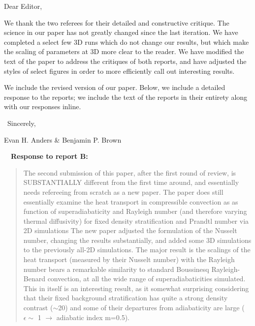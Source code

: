\documentclass[aps, 11pt, singlecolumn]{revtex4-1} %
\begin{document}
\noindent
Dear Editor,
$\,$\newline

\newenvironment{myquotation}{
\begin{quotation}
\itshape
}{ 
\end{quotation}
}

\begin{singlespace}
We thank the two referees for their detailed and constructive critique.
The science in our paper has not greatly changed since the last iteration.
We have completed a select few 3D runs which do not change our results,
but which make the scaling of parameters at 3D more clear to the reader.
We have modified the text of the paper to address the critiques of
both reports, and have adjusted the styles of select figures in order to
more efficiently call out interesting results.

We include the revised version of our paper.  Below, we include a
detailed response to the reports; we include the text of the reports
in their entirety along with our responses inline.

$\,$\newline
\noindent
Sincerely,

Evan H. Anders \& Benjamin P. Brown




$\,$
\newline
$\,$
\newline
\noindent
\Large{\textbf{Response to report B:}}\newline$\,$\newline\indent

\begin{myquotation}

The second submission of this paper, after the first round of review,
is SUBSTANTIALLY different from the first time around, and essentially
needs refereeing from scratch as a new paper. The paper does still
essentially examine the heat transport in compressible convection as
as function of superadiabaticity and Rayleigh number (and therefore
varying thermal diffusivity) for fixed density stratification and
Prandtl number via 2D simulations The new paper adjusted the
formulation of the Nusselt number, changing the results substantially,
and added some 3D simulations to the previously all-2D simulations.
The major result is the scalings of the heat transport (measured by
their Nusselt number) with the Rayleigh number bears a remarkable
similarity to standard Boussinesq Rayleigh-Benard convection, at all
the wide range of superadiabaticities simulated. This in itself is an
interesting result, as it somewhat surprising considering that their
fixed background stratification has quite a strong density contrast
($\sim$20) and some of their departures from adiabaticity are large
($\epsilon \sim$ 1 $\rightarrow$ adiabatic index m=0.5).


\end{myquotation}
\end{singlespace}
\end{document}
